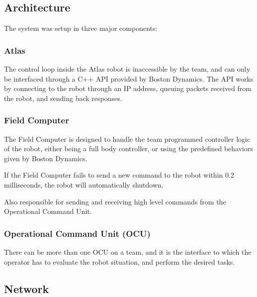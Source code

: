 \documentclass[12pt]{report}
\begin{document}
\subsection{Architecture}

The system was setup in three major components: 

\subsubsection{Atlas}
The control loop inside the Atlas robot is inaccessible by the team, and can only be interfaced through a C++ API provided by Boston Dynamics. The API works by connecting to the robot through an IP address, queuing packets received from the robot, and sending back responses. 

\subsubsection{Field Computer}
The Field Computer is designed to handle the team programmed controller logic of the robot, either being a full body controller, or using the predefined behaviors given by Boston Dynamics. 

If the Field Computer fails to send a new command to the robot within 0.2 milliseconds, the robot will automatically shutdown. 

Also responsible for sending and receiving high level commands from the Operational Command Unit.

\subsubsection{Operational Command Unit (OCU)}

There can be more than one OCU on a team, and it is the interface to which the operator has to evaluate the robot situation, and perform the desired tasks. 



\subsection{Network}
\end{document}
